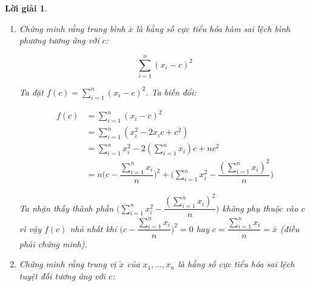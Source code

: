 \documentclass[14pt, a4paper]{article}
\theoremstyle{sltheorem}
\theoremstyle{soltheorem}
\newtheorem*{loigiai}{Lời giải}
\begin{document}
\begin{loigiai}
\begin{enumerate}[wide, labelwidth=!, labelindent=0pt,label=\textbf{\arabic*}.]
\begin{enumerate}
            Mặt khác, giả sử ta lấy mẫu $n$ điểm thì $\mathbb{E}(\Phi(X_{(k)})) = \dfrac{k}{n+1}$ (đã được chứng minh ở ý b).
            Vậy nên:

            \begin{equation*}
                \begin{aligned}
                    \mathbb{E} (P(X < X_{(k)})) = \mathbb{E} (\Phi(X_{(k)})) = \dfrac{k}{n+1}
                \end{aligned}
            \end{equation*}

            Theo định nghĩa phân vị mức: $P(X < z_q)=\Phi(z_q)=q$ và khi ta lấy mẫu một số lần đủ lớn thì $X_{(k)} \approx z_{k/n+1}$(điều phải chứng minh).
        \end{enumerate}

        \item Chứng minh rằng trung bình $\bar{x}$ là hằng số cực tiểu hóa hàm sai lệch bình phương tương ứng với $c$:

        \begin{equation*}
            \sum_{i=1}^n (x_i - c)^2
        \end{equation*}

        Ta đặt $f(c) = \sum_{i=1}^n (x_i - c)^2$. Ta biến đổi:

        \begin{equation*}
            \begin{aligned}
                f(c) &= \sum_{i=1}^n (x_i - c)^2 \\
                &= \sum_{i=1}^n (x_i^2 - 2x_i c + c^2) \\
                &= \sum_{i=1}^n x_i^2 - 2(\sum_{i=1}^n x_i)c + n c^2 \\
                &= n\Bigg(c - \dfrac{\sum_{i=1}^n x_i}{n}\Bigg)^2 + \Bigg(\sum_{i=1}^n x_i^2 - \dfrac{(\sum_{i=1}^n x_i)^2}{n}\Bigg)
            \end{aligned}
        \end{equation*}

        Ta nhận thấy thành phần $\Bigg(\sum_{i=1}^n x_i^2 - \dfrac{(\sum_{i=1}^n x_i)^2}{n}\Bigg)$ không phụ thuộc vào $c$ vì vậy $f(c)$ nhỏ nhất khi $\Bigg(c - \dfrac{\sum_{i=1}^n x_i}{n}\Bigg)^2=0$ hay $c= \dfrac{\sum_{i=1}^n x_i}{n} = \bar{x}$ (điều phải chứng minh).

        \item Chứng minh rằng trung vị $\tilde{x}$ của $x_1, \dots, x_n$ là hằng số cực tiểu hóa sai lệch tuyệt đối tương ứng với $c$:


\end{enumerate}
\end{loigiai}
\end{document}
